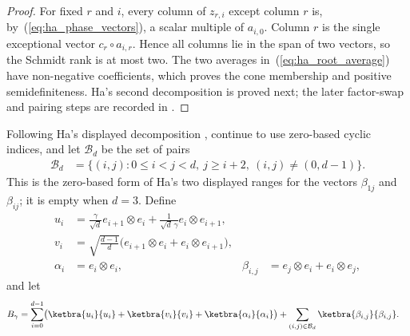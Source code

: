 \begin{proof}
    \leanok
    For fixed $r$ and $i$, every column of $z_{r,i}$ except column $r$ is,
    by~(\ref{eq:ha_phase_vectors}), a scalar multiple of $a_{i,0}$. Column
    $r$ is the single exceptional vector $c_r\circ a_{i,r}$. Hence all
    columns lie in the span of two vectors, so the Schmidt rank is at most
    two. The two averages in~(\ref{eq:ha_root_average}) have non-negative
    coefficients, which proves the cone membership and positive
    semidefiniteness. Ha's second decomposition is proved next; the later
    factor-swap and pairing steps are recorded in
    \cite{gap:ha98_choi_type_witness_scope}.
\end{proof}

\begin{definition}
    \label{def:ha_block_transpose_vectors}
    \leanok
    Following Ha's displayed decomposition
    \cite[pp.~594--595]{Ha1998AtomicPositiveMaps}, continue to use zero-based
    cyclic indices, and let
    $\mathcal B_d$ be the set of pairs
    \begin{align}
        \mathcal B_d
         & =\{(i,j):0\le i<j<d,\ j\ge i+2,\ (i,j)\ne(0,d-1)\}.
        \label{eq:ha_beta_pairs}
    \end{align}
    This is the zero-based form of Ha's two displayed ranges for the vectors
    $\beta_{1j}$ and $\beta_{ij}$; it is empty when $d=3$. Define
    \begin{align}
        u_i
         & =\frac{\gamma}{\sqrt d}e_{i+1}\otimes e_i
        +\frac{1}{\sqrt d\,\gamma}e_i\otimes e_{i+1},      \\
        v_i
         & =\sqrt{\frac{d-1}{d}}
        \bigl(e_{i+1}\otimes e_i+e_i\otimes e_{i+1}\bigr), \\
        \alpha_i
         & =e_i\otimes e_i,
         &
        \beta_{i,j}
         & =e_j\otimes e_i+e_i\otimes e_j,
        \label{eq:ha_block_transpose_vectors}
    \end{align}
    and let
    \begin{align}
        B_\gamma
         & =\sum_{i=0}^{d-1}
        \bigl(\ketbra{u_i}{u_i}+\ketbra{v_i}{v_i}
        +\ketbra{\alpha_i}{\alpha_i}\bigr)
        +\sum_{(i,j)\in\mathcal B_d}
        \ketbra{\beta_{i,j}}{\beta_{i,j}}.
        \label{eq:ha_block_transpose_decomposition}
    \end{align}
\end{definition}

